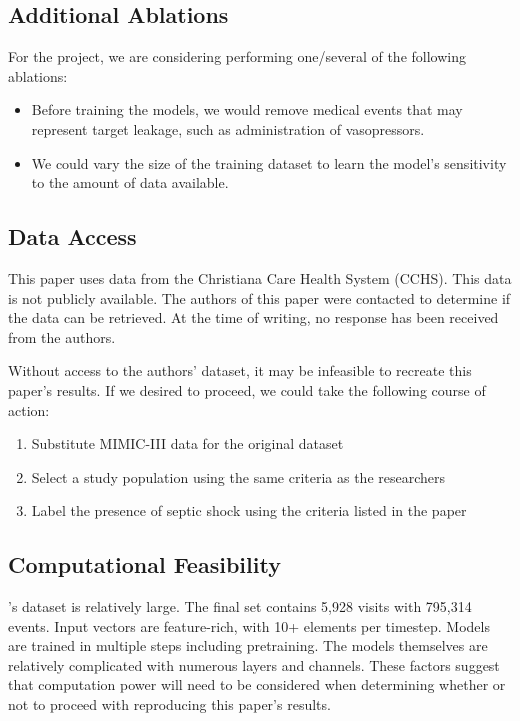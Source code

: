 \documentclass[11pt,a4paper]{article}
\begin{document}
\subsection{Additional Ablations}
For the project, we are considering performing one/several of the following ablations: 
\begin{itemize}
  \item Before training the models, we would remove medical events that may represent target leakage, such as administration of vasopressors.
  \item We could vary the size of the training dataset to learn the model's sensitivity to the amount of data available.
\end{itemize}

\subsection{Data Access}
This paper uses data from the Christiana Care Health System (CCHS). This data is not publicly available. The authors of this paper were contacted to determine if the data can be retrieved. At the time of writing, no response has been received from the authors.

Without access to the authors' dataset, it may be infeasible to recreate this paper's results. If we desired to proceed, we could take the following course of action: 
\begin{enumerate}
  \item Substitute MIMIC-III data for the original dataset
  \item Select a study population using the same criteria as the researchers
  \item Label the presence of septic shock using the criteria listed in the paper
\end{enumerate}

\subsection{Computational Feasibility}

\citeauthor{zhang_2019}'s \citeyearpar{zhang_2019} dataset is relatively large. The final set contains 5,928 visits with 795,314 events. Input vectors are feature-rich, with 10+ elements per timestep. Models are trained in multiple steps including pretraining. The models themselves are relatively complicated with numerous layers and channels. These factors suggest that computation power will need to be considered when determining whether or not to proceed with reproducing this paper's results. 
\end{document}

